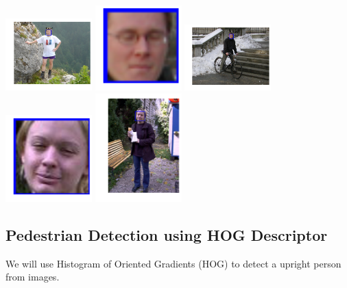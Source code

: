 \includegraphics[width=0.25\textwidth]{facedetection_files/facedetection_59_6.png}
\includegraphics[width=0.25\textwidth]{facedetection_files/facedetection_59_7.png}
\includegraphics[width=0.25\textwidth]{facedetection_files/facedetection_59_8.png}
\includegraphics[width=0.25\textwidth]{facedetection_files/facedetection_59_9.png}
\includegraphics[width=0.25\textwidth]{facedetection_files/facedetection_59_10.png}

\subsection{Pedestrian Detection using HOG Descriptor}

We will use Histogram of Oriented Gradients (HOG) to detect a upright
person from images.


